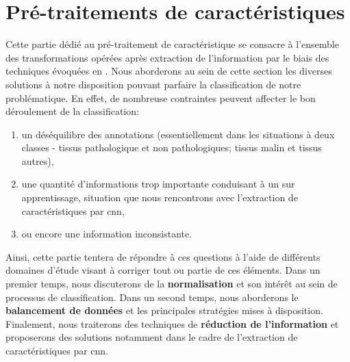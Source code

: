 \section{Pré-traitements de caractéristiques}
Cette partie dédié au pré-traitement de caractéristique se consacre à l'ensemble des transformations opérées après extraction de l'information par le biais des techniques évoquées en . Nous aborderons au sein de cette section les diverses solutions à notre disposition pouvant parfaire la classification de notre problématique. En effet, de nombreuse contraintes peuvent affecter le bon déroulement de la classification:
\begin{enumerate}
    \item un déséquilibre des annotations (essentiellement dans les situations à deux classes -  tissus pathologique et non pathologiques; tissus malin et tissus autres),
    \item une quantité d'informations trop importante conduisant à un sur apprentissage, situation que nous rencontrons avec l'extraction de caractéristiques par \gls{cnn},
    \item ou encore une information inconsistante.
\end{enumerate}\par

Ainsi, cette partie tentera de répondre à ces questions à l'aide de différents domaines d'étude visant à corriger tout ou partie de ces éléments. Dans un premier temps, nous discuterons de la \textbf{normalisation} et son intérêt au sein de processus de classification. Dans un second temps, nous aborderons le \textbf{balancement de données} et les principales stratégies mises à disposition. Finalement, nous traiterons des techniques de \textbf{réduction de l'information} et proposerons des solutions notamment dans le cadre de l'extraction de caractéristiques par \gls{cnn}.


